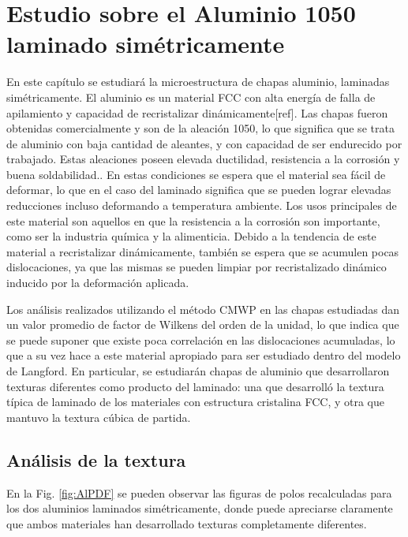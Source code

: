 \chapter{Estudio sobre el Aluminio 1050 laminado simétricamente}\label{C:AlS}
\graphicspath{{./figs/06_Al/}}

En este capítulo se estudiará la microestructura de chapas aluminio, laminadas simétricamente.
El aluminio es un material FCC con alta energía de falla de apilamiento y capacidad de recristalizar dinámicamente[ref].
Las chapas fueron obtenidas comercialmente y son de la aleación 1050, lo que significa que se trata de aluminio con baja cantidad de aleantes, y con capacidad de ser endurecido por trabajado.
Estas aleaciones poseen elevada ductilidad, resistencia a la corrosión y buena soldabilidad.\cite{ESAB:AlAlloys,AlOrg:AlAlloys,PAInt:AlAlloys}.
En estas condiciones se espera que el material sea fácil de deformar, lo que en el caso del laminado significa que se pueden lograr elevadas reducciones incluso deformando a temperatura ambiente.
Los usos principales de este material son aquellos en que la resistencia a la corrosión son importante, como ser la industria química y la alimenticia\cite{PAInt:AlAlloys,AZOM:AlAlloys}.
Debido a la tendencia de este material a recristalizar dinámicamente, también se espera que se acumulen pocas dislocaciones, ya que las mismas se pueden limpiar por recristalizado dinámico inducido por la deformación aplicada.

Los análisis realizados utilizando el método CMWP en las chapas estudiadas dan un valor promedio de factor de Wilkens del orden de la unidad, lo que indica que se puede suponer que existe poca correlación en las dislocaciones acumuladas, lo que a su vez hace a este material apropiado para ser estudiado dentro del modelo de Langford.
En particular, se estudiarán chapas de aluminio que desarrollaron texturas diferentes como producto del laminado: una que desarrolló la textura típica de laminado de los materiales con estructura cristalina FCC, y otra que mantuvo la textura cúbica de partida.

\section{Análisis de la textura}\label{S:AlText}
En la Fig. \ref{fig:AlPDF} se pueden observar las figuras de polos recalculadas para los dos aluminios laminados simétricamente, donde puede apreciarse claramente que ambos materiales han desarrollado texturas completamente diferentes.

